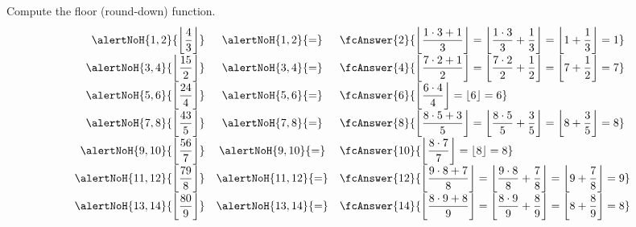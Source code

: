 \begin{frame}
\begin{example}
Compute the floor (round-down) function.
\[\renewcommand{\arraystretch}{1.8}
\begin{array}{rcl}
\displaystyle \alertNoH{1,2}{ \left\lfloor \frac{4}{3}  \right\rfloor} &\alertNoH{1,2}{=}&\displaystyle \fcAnswer{2}{ \left\lfloor\frac{1\cdot 3+1}{3}\right\rfloor= \left\lfloor \frac{1\cdot 3}{3}+ \frac{1}{3}\right\rfloor= \left\lfloor 1+ \frac{1}{3}\right\rfloor=1} \\
\displaystyle \alertNoH{3,4}{\left\lfloor \frac{15}{2} \right\rfloor} &\alertNoH{3,4}{=}& \displaystyle \fcAnswer{4}{ \left\lfloor\frac{7\cdot 2+1}{2}\right\rfloor= \left\lfloor \frac{7\cdot 2}{2}+ \frac{1}{2}\right\rfloor= \left\lfloor 7+ \frac{1}{2}\right\rfloor=7 }\\
\displaystyle \alertNoH{5,6}{\left\lfloor \frac{24}{4} \right\rfloor} &\alertNoH{5,6}{=}& \displaystyle \fcAnswer{6}{ \left\lfloor\frac{6\cdot 4}{4}\right\rfloor= \left\lfloor 6\right\rfloor= 6}\\
\displaystyle \alertNoH{7,8}{\left\lfloor \frac{43}{5} \right\rfloor} &\alertNoH{7,8}{=}& \displaystyle \fcAnswer{8}{ \left\lfloor\frac{8\cdot 5+3}{5}\right\rfloor= \left\lfloor \frac{8\cdot 5}{5}+ \frac{3}{5}\right\rfloor= \left\lfloor 8+ \frac{3}{5}\right\rfloor=8 }\\
\displaystyle \alertNoH{9,10}{\left\lfloor \frac{56}{7} \right\rfloor} &\alertNoH{9,10}{=}& \displaystyle \fcAnswer{10}{ \left\lfloor\frac{8\cdot 7}{7}\right\rfloor= \left\lfloor 8\right\rfloor= 8 }\\
\displaystyle \alertNoH{11,12}{\left\lfloor \frac{79}{8} \right\rfloor} &\alertNoH{11,12}{=}& \displaystyle \fcAnswer{12}{ \left\lfloor\frac{9\cdot 8+7}{8}\right\rfloor= \left\lfloor \frac{9\cdot 8}{8}+ \frac{7}{8}\right\rfloor= \left\lfloor 9+ \frac{7}{8}\right\rfloor=9}\\
\displaystyle \alertNoH{13,14}{\left\lfloor \frac{80}{9} \right\rfloor} &\alertNoH{13,14}{=}& \displaystyle \fcAnswer{14}{ \left\lfloor\frac{8\cdot 9+8}{9}\right\rfloor= \left\lfloor \frac{8\cdot 9}{9}+ \frac{8}{9}\right\rfloor= \left\lfloor 8+ \frac{8}{9}\right\rfloor=8}\\
\end{array}
\]
\end{example}
\end{frame}